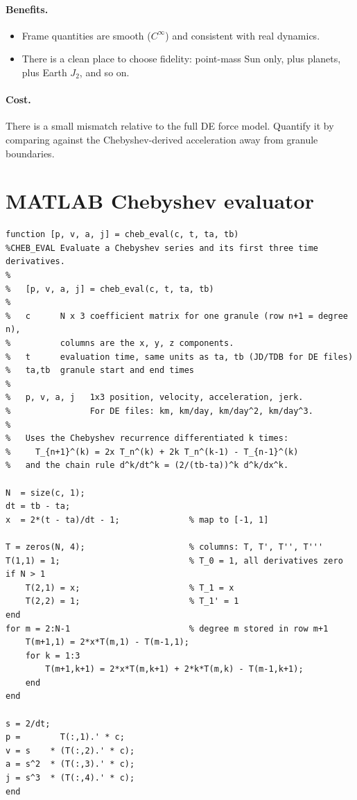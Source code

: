 \documentclass[11pt]{article}
\begin{document}
\paragraph{Benefits.}
\begin{itemize}
  \item Frame quantities are smooth ($C^\infty$) and consistent with real dynamics.
  \item There is a clean place to choose fidelity: point-mass Sun only, plus planets, plus Earth $J_2$, and so on.
\end{itemize}

\paragraph{Cost.} There is a small mismatch relative to the full DE force model. Quantify it by comparing against the Chebyshev-derived acceleration away from granule boundaries.

\nocite{szebehely1967,gomez_masdemont,deitos_topputo2017,jpl_ephemerides}
\printbibliography[heading=bibintoc]

\appendix
\section{MATLAB Chebyshev evaluator}
\label{app:code}

\begin{lstlisting}
function [p, v, a, j] = cheb_eval(c, t, ta, tb)
%CHEB_EVAL Evaluate a Chebyshev series and its first three time derivatives.
%
%   [p, v, a, j] = cheb_eval(c, t, ta, tb)
%
%   c      N x 3 coefficient matrix for one granule (row n+1 = degree n),
%          columns are the x, y, z components.
%   t      evaluation time, same units as ta, tb (JD/TDB for DE files)
%   ta,tb  granule start and end times
%
%   p, v, a, j   1x3 position, velocity, acceleration, jerk.
%                For DE files: km, km/day, km/day^2, km/day^3.
%
%   Uses the Chebyshev recurrence differentiated k times:
%     T_{n+1}^(k) = 2x T_n^(k) + 2k T_n^(k-1) - T_{n-1}^(k)
%   and the chain rule d^k/dt^k = (2/(tb-ta))^k d^k/dx^k.

N  = size(c, 1);
dt = tb - ta;
x  = 2*(t - ta)/dt - 1;              % map to [-1, 1]

T = zeros(N, 4);                     % columns: T, T', T'', T'''
T(1,1) = 1;                          % T_0 = 1, all derivatives zero
if N > 1
    T(2,1) = x;                      % T_1 = x
    T(2,2) = 1;                      % T_1' = 1
end
for m = 2:N-1                        % degree m stored in row m+1
    T(m+1,1) = 2*x*T(m,1) - T(m-1,1);
    for k = 1:3
        T(m+1,k+1) = 2*x*T(m,k+1) + 2*k*T(m,k) - T(m-1,k+1);
    end
end

s = 2/dt;
p =        T(:,1).' * c;
v = s    * (T(:,2).' * c);
a = s^2  * (T(:,3).' * c);
j = s^3  * (T(:,4).' * c);
end
\end{lstlisting}
\end{document}
